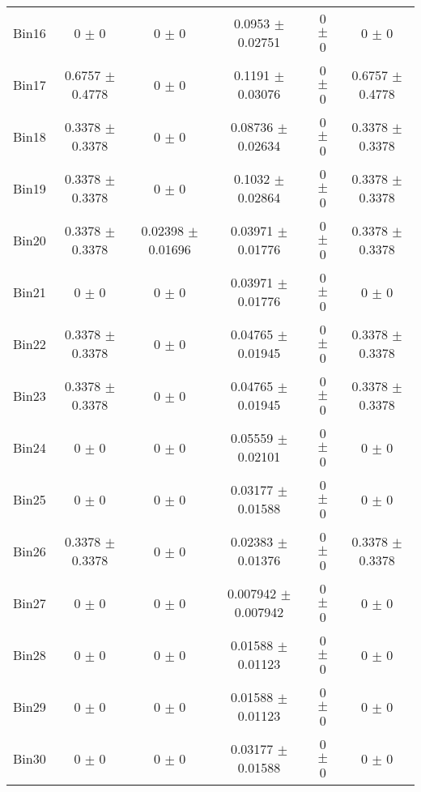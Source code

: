 \begin{tabular}{@{\extracolsep{4pt}}lccccc@{}}
     Bin16 & 0 $\pm$ 0 & 0 $\pm$ 0 & 0.0953 $\pm$ 0.02751 & 0 $\pm$ 0 & 0 $\pm$ 0 \\ 
     Bin17 & 0.6757 $\pm$ 0.4778 & 0 $\pm$ 0 & 0.1191 $\pm$ 0.03076 & 0 $\pm$ 0 & 0.6757 $\pm$ 0.4778 \\ 
     Bin18 & 0.3378 $\pm$ 0.3378 & 0 $\pm$ 0 & 0.08736 $\pm$ 0.02634 & 0 $\pm$ 0 & 0.3378 $\pm$ 0.3378 \\ 
     Bin19 & 0.3378 $\pm$ 0.3378 & 0 $\pm$ 0 & 0.1032 $\pm$ 0.02864 & 0 $\pm$ 0 & 0.3378 $\pm$ 0.3378 \\ 
     Bin20 & 0.3378 $\pm$ 0.3378 & 0.02398 $\pm$ 0.01696 & 0.03971 $\pm$ 0.01776 & 0 $\pm$ 0 & 0.3378 $\pm$ 0.3378 \\ 
     Bin21 & 0 $\pm$ 0 & 0 $\pm$ 0 & 0.03971 $\pm$ 0.01776 & 0 $\pm$ 0 & 0 $\pm$ 0 \\ 
     Bin22 & 0.3378 $\pm$ 0.3378 & 0 $\pm$ 0 & 0.04765 $\pm$ 0.01945 & 0 $\pm$ 0 & 0.3378 $\pm$ 0.3378 \\ 
     Bin23 & 0.3378 $\pm$ 0.3378 & 0 $\pm$ 0 & 0.04765 $\pm$ 0.01945 & 0 $\pm$ 0 & 0.3378 $\pm$ 0.3378 \\ 
     Bin24 & 0 $\pm$ 0 & 0 $\pm$ 0 & 0.05559 $\pm$ 0.02101 & 0 $\pm$ 0 & 0 $\pm$ 0 \\ 
     Bin25 & 0 $\pm$ 0 & 0 $\pm$ 0 & 0.03177 $\pm$ 0.01588 & 0 $\pm$ 0 & 0 $\pm$ 0 \\ 
     Bin26 & 0.3378 $\pm$ 0.3378 & 0 $\pm$ 0 & 0.02383 $\pm$ 0.01376 & 0 $\pm$ 0 & 0.3378 $\pm$ 0.3378 \\ 
     Bin27 & 0 $\pm$ 0 & 0 $\pm$ 0 & 0.007942 $\pm$ 0.007942 & 0 $\pm$ 0 & 0 $\pm$ 0 \\ 
     Bin28 & 0 $\pm$ 0 & 0 $\pm$ 0 & 0.01588 $\pm$ 0.01123 & 0 $\pm$ 0 & 0 $\pm$ 0 \\ 
     Bin29 & 0 $\pm$ 0 & 0 $\pm$ 0 & 0.01588 $\pm$ 0.01123 & 0 $\pm$ 0 & 0 $\pm$ 0 \\ 
     Bin30 & 0 $\pm$ 0 & 0 $\pm$ 0 & 0.03177 $\pm$ 0.01588 & 0 $\pm$ 0 & 0 $\pm$ 0 \\ 
\hline\hline
  \end{tabular}
